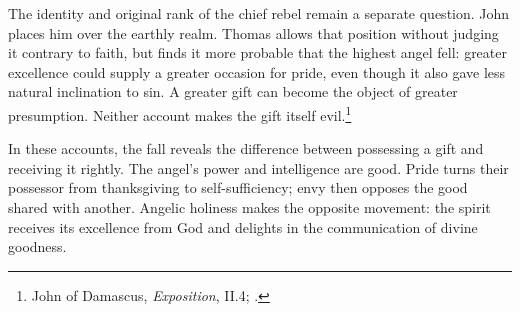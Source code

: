 The identity and original rank of the chief rebel remain a separate question.
John places him over the earthly realm. Thomas allows that position without
judging it contrary to faith, but finds it more probable that the highest
angel fell: greater excellence could supply a greater occasion for pride,
even though it also gave less natural inclination to sin. A greater gift
can become the object of greater presumption. Neither account makes the gift
itself evil.\footnote{John of Damascus, \emph{Exposition}, II.4;
.}

In these accounts, the fall reveals the difference between possessing a gift
and receiving it rightly. The angel's power and intelligence are good. Pride
turns their possessor from thanksgiving to self-sufficiency; envy then
opposes the good shared with another. Angelic holiness makes the opposite
movement: the spirit receives its excellence from God and delights in the
communication of divine goodness.
